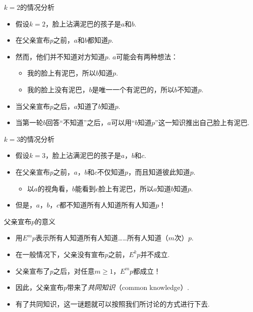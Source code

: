 \begin{frame}{$k=2$的情况分析}
\begin{itemize}
    \item 假设$k=2$，脸上沾满泥巴的孩子是$a$和$b$. 
    \item 在父亲宣布$p$之前，$a$和$b$都知道$p$.
    \item 然而，他们并不知道对方知道$p$. $a$可能会有两种想法：
    \begin{itemize}
        \item 我的脸上有泥巴，所以$b$知道$p$.
        \item 我的脸上没有泥巴，$b$是唯一一个有泥巴的，所以$b$不知道$p$.
    \end{itemize}
    \item 当父亲宣布$p$之后，$a$知道了$b$知道$p$.
    \item 当第一轮$b$回答“不知道”之后，$a$可以用“$b$知道$p$”这一知识推出自己脸上有泥巴.
\end{itemize}
\end{frame}

\begin{frame}{$k=3$的情况分析}
\begin{itemize}
    \item 假设$k=3$，脸上沾满泥巴的孩子是$a$，$b$和$c$. 
    \item 在父亲宣布$p$之前，$a$，$b$和$c$不仅知道$p$，而且知道彼此知道$p$.
    \begin{itemize}
        \item 以$a$的视角看，$b$能看到$c$脸上有泥巴，所以$a$知道$b$知道$p$.
    \end{itemize}
    \item 但是，$a$，$b$，$c$都不知道所有人知道所有人知道$p$！
\end{itemize}
\end{frame}

\begin{frame}{父亲宣布$p$的意义}
\begin{itemize}
    \item 用$E^m p$表示所有人知道所有人知道……所有人知道（$m$次）$p$.
    \item 在一般情况下，父亲没有宣布$p$之前，$E^k p$并不成立.
    \item 父亲宣布了$p$之后，对任意$m\geq 1$，$E^m p$都成立！
    \item 因此，父亲宣布$p$带来了\emph{共同知识}（common knowledge）.
    \item 有了共同知识，这一谜题就可以按照我们所讨论的方式进行下去.
\end{itemize}
\end{frame}

